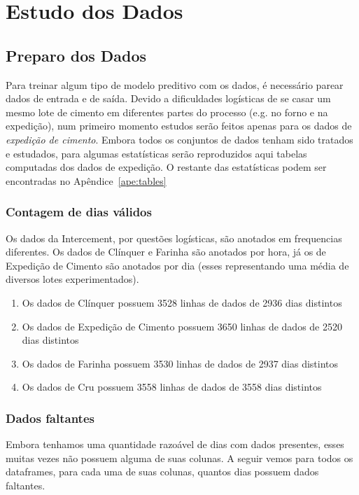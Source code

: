 \chapter{Estudo dos Dados}
\label{cap:estudodados}


\section{Preparo dos Dados}


Para treinar algum tipo de modelo preditivo com os dados, é necessário parear
dados de entrada e de saída. Devido a dificuldades logísticas de se casar um
mesmo lote de cimento em diferentes partes do processo (e.g. no forno e na
expedição), num primeiro momento estudos serão feitos apenas para os dados de
\textit{expedição de cimento}. Embora todos os conjuntos de dados tenham sido
tratados e estudados, para algumas estatísticas serão reproduzidos aqui tabelas computadas dos
dados de expedição. O restante das estatísticas podem ser encontradas no Apêndice~\ref{ape:tables}

\subsection{Contagem de dias válidos}

Os dados da Intercement, por questões logísticas, são anotados em frequencias
diferentes. Os dados de Clínquer e Farinha são anotados por hora, já os de
Expedição de Cimento são anotados por dia (esses representando uma média de
diversos lotes experimentados).

\begin{enumerate}
    \item Os dados de  Clínquer possuem 3528 linhas de dados de 2936 dias distintos
\item Os dados de  Expedição de Cimento possuem 3650 linhas de dados de 2520 dias distintos
\item Os dados de  Farinha possuem 3530 linhas de dados de 2937 dias distintos
\item Os dados de  Cru possuem 3558 linhas de dados de 3558 dias distintos
\end{enumerate}

\subsection{Dados faltantes}
Embora tenhamos uma quantidade razoável de dias com dados presentes, esses muitas vezes não possuem alguma de suas colunas.
A seguir vemos para todos os dataframes, para cada uma de suas colunas, quantos
dias possuem dados faltantes. 

